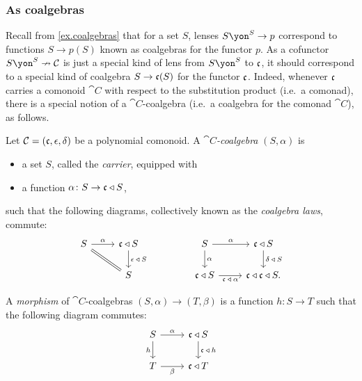 \documentclass[Book-Poly]{subfiles}
\begin{document}
\subsubsection{As coalgebras}

Recall from \cref{ex.coalgebras} that for a set $S$, lenses $S\yon^S\to p$ correspond to functions $S\to p(S)$ known as coalgebras for the functor $p$.
As a cofunctor $S\yon^S\cof\cat{C}$ is just a special kind of lens from $S\yon^S$ to $\mathfrak{c}$, it should correspond to a special kind of coalgebra $S\to\mathfrak{c}(S)$ for the functor $\mathfrak{c}$.
Indeed, whenever $\mathfrak{c}$ carries a comonoid $\cat{C}$ with respect to the substitution product (i.e.\ a comonad), there is a special notion of a $\cat{C}$-coalgebra (i.e.\ a coalgebra for the comonad $\cat{C}$), as follows.

\begin{definition}\label{def.coalgebra}
Let $\mathcal{C}=(\mathfrak{c},\epsilon,\delta)$ be a polynomial comonoid.
A \emph{$\cat{C}$-coalgebra} $(S,\alpha)$ is
\begin{itemize}
    \item a set $S$, called the \emph{carrier}, equipped with
    \item a function $\alpha\colon S\to\mathfrak{c}\mathbin{\triangleleft} S$,
\end{itemize}
such that the following diagrams, collectively known as the \emph{coalgebra laws}, commute:
\begin{equation} \label{eqn.coalg_laws}
\begin{tikzcd}
    S \ar[r, "\alpha"] \ar[dr, equal] &
    \car{c}\tri S \ar[d, "\epsilon\:\tri\:S"] \\
    & S
\end{tikzcd}
\hspace{.6in}
\begin{tikzcd}
    S \ar[d, "\alpha"] \ar[r, "\alpha"] &
    \car{c}\tri S \ar[d, "\delta\:\tri\:S"] \\
    \car{c}\tri S \ar[r, "\car{c}\:\tri\:\alpha"'] &
	\car{c}\tri\car{c}\tri S.
\end{tikzcd}
\end{equation}

A \emph{morphism} of $\cat{C}$-coalgebras $(S,\alpha)\to(T,\beta)$ is a function $h\colon S\to T$ such that the following diagram commutes:
\[
\begin{tikzcd}
    S \ar[d, "h"'] \ar[r, "\alpha"] &
    \car{c}\tri S \ar[d, "\car{c}\:\tri\:h"] \\
    T \ar[r, "\beta"'] &
    \car{c}\tri T
\end{tikzcd}
\]
\end{definition}
\end{document}

